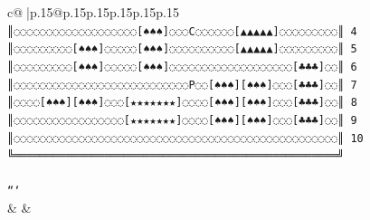 \documentclass{article}
\begin{document}
{\begin{supertabular}{c@{$\;$}|p{.15\linewidth}@{}p{.15\linewidth}p{.15\linewidth}p{.15\linewidth}p{.15\linewidth}p{.15\linewidth}}
{{{\texttt{║◌◌◌◌◌◌◌◌◌◌◌◌◌◌◌◌◌◌◌{[}♠♠♠{]}◌◌◌C◌◌◌◌◌◌{[}▲▲▲▲▲{]}◌◌◌◌◌◌◌◌◌║ 4} \\
\texttt{║◌◌◌◌◌◌◌◌◌{[}♠♠♠{]}◌◌◌◌◌{[}♠♠♠{]}◌◌◌◌◌◌◌◌◌◌{[}▲▲▲▲▲{]}◌◌◌◌◌◌◌◌◌║ 5} \\
\texttt{║◌◌◌◌◌◌◌◌◌{[}♠♠♠{]}◌◌◌◌◌{[}♠♠♠{]}◌◌◌◌◌◌◌◌◌◌◌◌◌◌◌◌◌◌◌{[}♣♣♣{]}◌◌║ 6} \\
\texttt{║◌◌◌◌◌◌◌◌◌◌◌◌◌◌◌◌◌◌◌◌◌◌◌◌◌◌◌P◌◌{[}♠♠♠{]}{[}♠♠♠{]}◌◌◌{[}♣♣♣{]}◌◌║ 7} \\
\texttt{║◌◌◌◌{[}♠♠♠{]}{[}♠♠♠{]}◌◌◌{[}★★★★★★★{]}◌◌◌◌{[}♠♠♠{]}{[}♠♠♠{]}◌◌◌{[}♣♣♣{]}◌◌║ 8} \\
\texttt{║◌◌◌◌◌◌◌◌◌◌◌◌◌◌◌◌◌{[}★★★★★★★{]}◌◌◌◌{[}♠♠♠{]}{[}♠♠♠{]}◌◌◌{[}♣♣♣{]}◌◌║ 9} \\
\texttt{║◌◌◌◌◌◌◌◌◌◌◌◌◌◌◌◌◌◌◌◌◌◌◌◌◌◌◌◌◌◌◌◌◌◌◌◌◌◌◌◌◌◌◌◌◌◌◌◌◌◌║ 10} \\
\texttt{╚══════════════════════════════════════════════════╝} \\
\\ 
\texttt{```} \\
            }
        }
    }
    & & \\ \\


\end{supertabular}}
\end{document}
